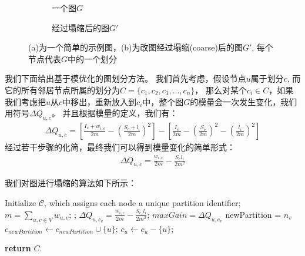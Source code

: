 \documentclass[master]{njuthesis}
\begin{document}
\begin{figure}[t]
    \centering
    \begin{subfigure}[b]{0.48\linewidth}        %
        \centering
        \label{fig:two:one}
	\resizebox{!}{!}{}
	\caption{一个图$G$　}
	\label{fig:figure2:figure1} 
	\end{subfigure}
    \begin{subfigure}[b]{0.48\linewidth}        %
     \centering
	\resizebox{!}{!}{}
	\caption{经过塌缩后的图$G\prime$}
	\label{fig:figure2:figure2}
    \end{subfigure}
    \caption{(a)为一个简单的示例图，(b)为改图经过塌缩(coarse)后的图$G\prime$, 每个节点代表$G$中的一个划分}
    \label{fig:two}
\end{figure}
我们下面给出基于模优化的图划分方法。
我们首先考虑，假设节点$u$属于划分$c$, 而它的所有邻居节点所属的划分为$C = \{c_1, c_2, c_3, \dots, c_n \}$，
那么对某个$c_i \in C$，如果我们考虑把$u$从$c$中移出，重新放入到$c_i$中，整个图$G$的模量会一次发生变化，我们用符号$\Delta Q_{u,c}$。
并且根据模量的定义，我们有：
\begin{equation}
\begin{aligned}
 \Delta Q_{u,c}=\left[ \frac{I_c+w_{i,c}}{2m} - {\left(\frac{S_c + l_i}{2m} \right)}^2 \right] -
 \left[ \frac{I_c}{2m} - {\left(\frac{S_c}{2m} \right)}^2 - {\left(\frac{l_i}{2m}\right)}^2 \right]
\end{aligned}
\end{equation}
经过若干步骤的化简，最终我们可以得到模量变化的简单形式：
\begin{equation}
\begin{aligned}
 \Delta Q_{u,c}=\frac{w_{i,c}}{2m} - \frac{S_cl_i}{2m^2} 
\end{aligned}
\end{equation}

我们对图进行塌缩的算法如下所示：
\begin{algorithm}[h]
\label{alg:mlgp}
\begin{algorithmic}[1]
	    \State Initialize $\mathcal{C}$, which assigns each node a unique partition identifier;
	    \State $m=\sum\nolimits_{u,v \in V} w_{u,v}$;
		;
		     \State $\Delta Q_{u,c_{v}}=\frac{w_{i,c}}{2m} - \frac{S_{c_v}l_i}{2m^2}$;
		      \State $maxGain = \Delta Q_{u,c_{v}}$
		      \State newPartition = $n_v$
		     \EndIf
		\EndFor
		    \State $c_{newPartition} \gets c_{newPartition}\cup\{u\}$;
		    \State $c_{u} \gets c_{u} - \{u\}$;
		\EndIf	
	    
	    \EndFor
	\EndWhile
\State \textbf{return} $C$.
\EndProcedure
\end{algorithmic}
\end{algorithm}
\end{document}
